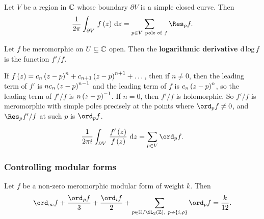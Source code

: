 \begin{theorem}
Let $ V $ be a region in $ \mathbb{C} $ whose boundary $ \partial V $ is a simple closed curve. Then
$$ \dfrac{1}{2\pi}\intd{\partial V}{}{f\br{z}}{z} = \sum_{p \in V \ \text{pole of} \ f} \Res_p f. $$
\end{theorem}

\begin{definition}
Let $ f $ be meromorphic on $ U \subseteq \mathbb{C} $ open. Then the \textbf{logarithmic derivative} $ \mathrm{d}\log f $ is the function $ f' / f $.
\end{definition}

If $ f\br{z} = c_n\br{z - p}^n + c_{n + 1}\br{z - p}^{n + 1} + \dots $, then if $ n \ne 0 $, then the leading term of $ f' $ is $ nc_n\br{z - p}^{n - 1} $ and the leading term of $ f $ is $ c_n\br{z - p}^n $, so the leading term of $ f' / f $ is $ n\br{z - p}^{-1} $. If $ n = 0 $, then $ f' / f $ is holomorphic. So $ f' / f $ is meromorphic with simple poles precisely at the points where $ \ord_p f \ne 0 $, and $ \Res_p f' / f $ at such $ p $ is $ \ord_p f $.

\begin{theorem}
$$ \dfrac{1}{2\pi i}\intd{\partial V}{}{\dfrac{f'\br{z}}{f\br{z}}}{z} = \sum_{p \in V} \ord_p f. $$
\end{theorem}

\pagebreak

\subsubsection{Controlling modular forms}

\begin{theorem}
Let $ f $ be a non-zero meromorphic modular form of weight $ k $. Then
$$ \ord_\infty f + \dfrac{\ord_\rho f}{3} + \dfrac{\ord_i f}{2} + \sum_{p \in \HH / \SL_2\br{\ZZ}, \ p \nsim \cbr{i, \rho}} \ord_p f = \dfrac{k}{12}. $$
\end{theorem}


